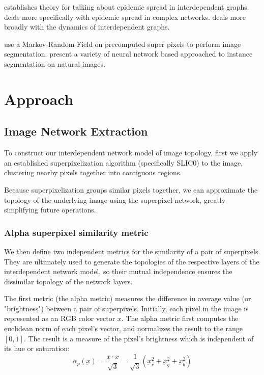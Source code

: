 \documentclass[twocolumn]{article}
\newcommand{\seclab}[1]{\label{sec:#1}}
\begin{document}
\cite{son2012percolation} establishes theory for talking about epidemic spread
in interdependent graphs. \cite{pastor2015epidemic, pellis2015eight} deals more
specifically with epidemic spread in complex networks.
\cite{boccaletti2014structure, kivela2014multilayer} deals more broadly with the
dynamics of interdependent graphs.

\cite{pei2014saliency} use a Markov-Random-Field on precomputed super pixels to
perform image segmentation.  \cite{newell2017associative, li2017fully,
ren2017end} present a variety of neural network based approached to instance
segmentation on natural images.

\section{Approach}\seclab{approach}

\subsection{Image Network Extraction}

To construct our interdependent network model of image topology, first we apply an established superpixelization algorithm (specifically SLIC0) to the image, clustering nearby pixels together into contiguous regions.

Because superpixelization groups similar pixels together, we can approximate the topology of the underlying image using the superpixel network, greatly simplifying future operations.

\subsubsection{Alpha superpixel similarity metric}

We then define two independent metrics for the similarity of a pair of superpixels. They are ultimately used to generate the topologies of the respective layers of the interdependent network model, so their mutual independence ensures the dissimilar topology of the network layers.

The first metric (the alpha metric) measures the difference in average value (or "brightness") between a pair of superpixels. Initially, each pixel in the image is represented as an RGB color vector $x$. The alpha metric first computes the euclidean norm of each pixel's vector, and normalizes the result to the range $[0, 1]$. The result is a measure of the pixel's brightness which is independent of its hue or saturation:
\[
    \alpha_p(\underbar{x}) = \frac{\underbar{x} \cdot \underbar{x}}{\sqrt{3}} = \frac{1}{\sqrt{3}}(\underbar{x}_r^2+\underbar{x}_g^2+\underbar{x}_b^2)
\]
\end{document}
